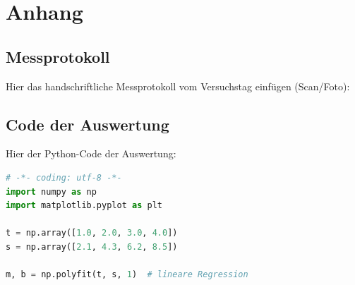 \section{Anhang}
\label{cap:Anhang}

\subsection{Messprotokoll}
Hier das handschriftliche Messprotokoll vom Versuchstag einfügen (Scan/Foto):
%

\subsection{Code der Auswertung}
Hier der Python-Code der Auswertung:
\begin{lstlisting}[language=Python, caption={Code: Auswertung der Messdaten}]
# -*- coding: utf-8 -*-
import numpy as np
import matplotlib.pyplot as plt

t = np.array([1.0, 2.0, 3.0, 4.0])
s = np.array([2.1, 4.3, 6.2, 8.5])

m, b = np.polyfit(t, s, 1)  # lineare Regression
\end{lstlisting}
